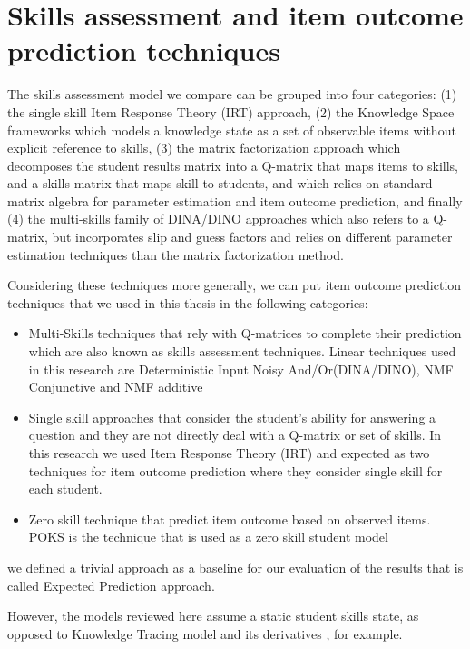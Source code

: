 \section{Skills assessment and item outcome prediction techniques}

The skills assessment model we compare can be grouped into four categories: (1) the single skill Item Response Theory (IRT) approach, (2) the Knowledge Space frameworks which models a knowledge state as a set of observable items without explicit reference to skills, (3) the matrix factorization approach which decomposes the student results matrix into a Q-matrix that maps items to skills, and a skills matrix that maps skill to students, and which relies on standard matrix algebra for parameter estimation and item outcome prediction, and finally (4) the multi-skills family of DINA/DINO approaches which also refers to a Q-matrix, but incorporates slip and guess factors and relies on different parameter estimation techniques than the matrix factorization method.

Considering  these techniques more generally, we can put item outcome prediction techniques that we used in this thesis in the following categories: 
\begin{itemize}
\item Multi-Skills techniques that rely with Q-matrices to complete their prediction which are also known as skills assessment techniques. Linear techniques used in this research are Deterministic Input Noisy And/Or(DINA/DINO), NMF Conjunctive and \ac{NMF} additive
\item Single skill approaches that consider the student's ability for answering a question and they are not directly deal with a Q-matrix or set of skills. In this research we used Item Response Theory (IRT) and expected as two  techniques for item outcome prediction where they consider single skill for each student.
\item Zero skill technique that predict item outcome based on observed items. POKS is the technique that is used as a zero skill student model
\end{itemize}  
\DIFdelbegin {}\DIFdelend \DIFaddbegin {}\DIFaddend we defined a trivial approach as a baseline for our evaluation of the results that is called Expected Prediction approach.

However, the models reviewed here assume a static student skills state, as opposed to Knowledge Tracing model and its derivatives \cite{Koedinger2011}, for example.

